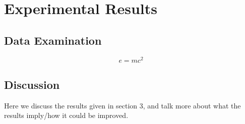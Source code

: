 \section{Experimental Results}

\subsection{Data Examination}


\begin{equation}
\label{eq:emc}
e = mc^2
\end{equation}



\subsection{Discussion}
Here we discuss the results given in section 3, and talk more about what the results imply/how it could be improved.